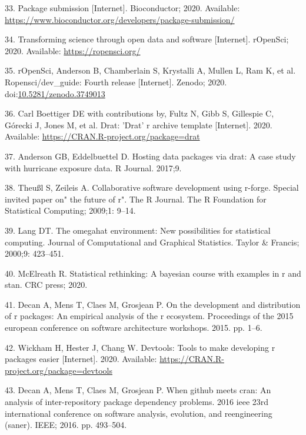 \documentclass[10pt,letterpaper]{article}
\begin{document}
\leavevmode\hypertarget{ref-biocpkgsub2020}{}%
33. Package submission {[}Internet{]}. Bioconductor; 2020. Available:
\url{https://www.bioconductor.org/developers/package-submission/}

\leavevmode\hypertarget{ref-ropensci2020}{}%
34. Transforming science through open data and software {[}Internet{]}.
rOpenSci; 2020. Available: \url{https://ropensci.org/}

\leavevmode\hypertarget{ref-ropenscidev2020}{}%
35. rOpenSci, Anderson B, Chamberlain S, Krystalli A, Mullen L, Ram K,
et al. Ropensci/dev\_guide: Fourth release {[}Internet{]}. Zenodo; 2020.
doi:\href{https://doi.org/10.5281/zenodo.3749013}{10.5281/zenodo.3749013}

\leavevmode\hypertarget{ref-drat}{}%
36. Carl Boettiger DE with contributions by, Fultz N, Gibb S, Gillespie
C, Górecki J, Jones M, et al. Drat: 'Drat' r archive template
{[}Internet{]}. 2020. Available:
\url{https://CRAN.R-project.org/package=drat}

\leavevmode\hypertarget{ref-anderson2017}{}%
37. Anderson GB, Eddelbuettel D. Hosting data packages via drat: A case
study with hurricane exposure data. R Journal. 2017;9.

\leavevmode\hypertarget{ref-theussl2009}{}%
38. Theußl S, Zeileis A. Collaborative software development using
r-forge. Special invited paper on" the future of r". The R Journal. The
R Foundation for Statistical Computing; 2009;1: 9--14.

\leavevmode\hypertarget{ref-lang2000}{}%
39. Lang DT. The omegahat environment: New possibilities for statistical
computing. Journal of Computational and Graphical Statistics. Taylor \&
Francis; 2000;9: 423--451.

\leavevmode\hypertarget{ref-mcelreath2020}{}%
40. McElreath R. Statistical rethinking: A bayesian course with examples
in r and stan. CRC press; 2020.

\leavevmode\hypertarget{ref-decan2015}{}%
41. Decan A, Mens T, Claes M, Grosjean P. On the development and
distribution of r packages: An empirical analysis of the r ecosystem.
Proceedings of the 2015 european conference on software architecture
workshops. 2015. pp. 1--6.

\leavevmode\hypertarget{ref-devtools}{}%
42. Wickham H, Hester J, Chang W. Devtools: Tools to make developing r
packages easier {[}Internet{]}. 2020. Available:
\url{https://CRAN.R-project.org/package=devtools}

\leavevmode\hypertarget{ref-decan2016}{}%
43. Decan A, Mens T, Claes M, Grosjean P. When github meets cran: An
analysis of inter-repository package dependency problems. 2016 ieee 23rd
international conference on software analysis, evolution, and
reengineering (saner). IEEE; 2016. pp. 493--504.
\end{document}
